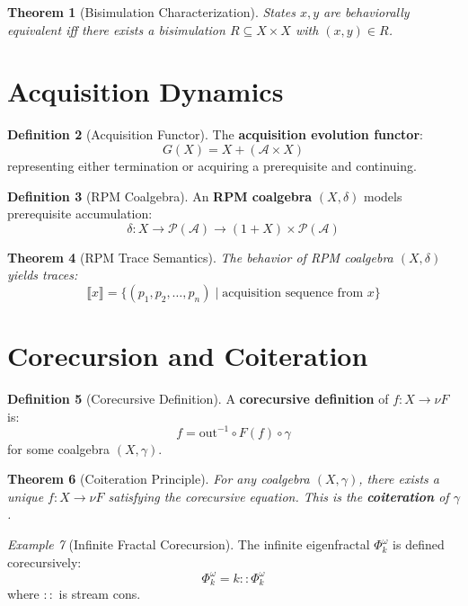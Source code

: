 \documentclass[11pt,twoside,openright]{book}
\theoremstyle{definition}
\newtheorem{definition}{Definition}[chapter]
\theoremstyle{plain}
\newtheorem{theorem}[definition]{Theorem}
\theoremstyle{remark}
\newtheorem{example}[definition]{Example}
\newcommand{\Acquisitions}{\mathcal{A}}
\newcommand{\TransFrac}[1]{\Phi^{#1}}        %
\begin{document}
\begin{theorem}[Bisimulation Characterization]
\label{thm:bisim}
States $x, y$ are behaviorally equivalent iff there exists a bisimulation $R \subseteq X \times X$ with $(x, y) \in R$.
\end{theorem}

\section{Acquisition Dynamics}

\begin{definition}[Acquisition Functor]
\label{def:acq-functor}
The \textbf{acquisition evolution functor}:
\[
G(X) = X + (\Acquisitions \times X)
\]
representing either termination or acquiring a prerequisite and continuing.
\end{definition}

\begin{definition}[RPM Coalgebra]
\label{def:rpm-coalgebra}
An \textbf{RPM coalgebra} $(X, \delta)$ models prerequisite accumulation:
\[
\delta : X \to \mathcal{P}(\Acquisitions) \to (1 + X) \times \mathcal{P}(\Acquisitions)
\]
\end{definition}

\begin{theorem}[RPM Trace Semantics]
\label{thm:rpm-trace}
The behavior of RPM coalgebra $(X, \delta)$ yields traces:
\[
\llbracket x \rrbracket = \{(p_1, p_2, \ldots, p_n) \mid \text{acquisition sequence from } x\}
\]
\end{theorem}

\section{Corecursion and Coiteration}

\begin{definition}[Corecursive Definition]
\label{def:corecursive}
A \textbf{corecursive definition} of $f : X \to \nu F$ is:
\[
f = \mathrm{out}^{-1} \circ F(f) \circ \gamma
\]
for some coalgebra $(X, \gamma)$.
\end{definition}

\begin{theorem}[Coiteration Principle]
\label{thm:coiteration}
For any coalgebra $(X, \gamma)$, there exists a unique $f : X \to \nu F$ satisfying the corecursive equation. This is the \textbf{coiteration} of $\gamma$.
\end{theorem}

\begin{example}[Infinite Fractal Corecursion]
\label{ex:infinite-fractal}
The infinite eigenfractal $\TransFrac{\omega}_k$ is defined corecursively:
\[
\TransFrac{\omega}_k = k :: \TransFrac{\omega}_k
\]
where $::$ is stream cons.
\end{example}
\end{document}
